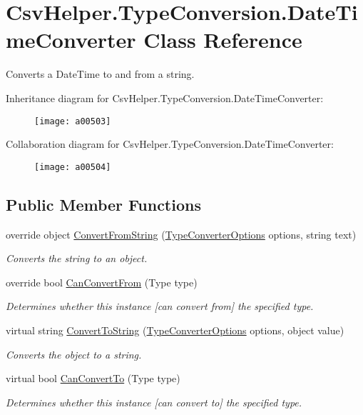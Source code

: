 \hypertarget{a00074}{\section{Csv\-Helper.\-Type\-Conversion.\-Date\-Time\-Converter Class Reference}
\label{a00074}
}


Converts a Date\-Time to and from a string.  




Inheritance diagram for Csv\-Helper.\-Type\-Conversion.\-Date\-Time\-Converter\-:
\nopagebreak
\begin{figure}[H]
\begin{center}
\leavevmode
\texttt{[image: a00503]}
\end{center}
\end{figure}


Collaboration diagram for Csv\-Helper.\-Type\-Conversion.\-Date\-Time\-Converter\-:
\nopagebreak
\begin{figure}[H]
\begin{center}
\leavevmode
\texttt{[image: a00504]}
\end{center}
\end{figure}
\subsection*{Public Member Functions}
\begin{DoxyCompactItemize}
\item 
override object \hyperlink{a00074_a6b1b54cb2d1b200beb8fa3c63e4c064a}{Convert\-From\-String} (\hyperlink{a00168}{Type\-Converter\-Options} options, string text)
\begin{DoxyCompactList}\small\item\em Converts the string to an object. \end{DoxyCompactList}\item 
override bool \hyperlink{a00074_af44239d3bd014b1423fa80f7440bbd25}{Can\-Convert\-From} (Type type)
\begin{DoxyCompactList}\small\item\em Determines whether this instance \mbox{[}can convert from\mbox{]} the specified type. \end{DoxyCompactList}\item 
virtual string \hyperlink{a00078_a36cb2f9b24f15a671293f3a722324c27}{Convert\-To\-String} (\hyperlink{a00168}{Type\-Converter\-Options} options, object value)
\begin{DoxyCompactList}\small\item\em Converts the object to a string. \end{DoxyCompactList}\item 
virtual bool \hyperlink{a00078_acb65bd8c8199d88d5b1629ae35d18514}{Can\-Convert\-To} (Type type)
\begin{DoxyCompactList}\small\item\em Determines whether this instance \mbox{[}can convert to\mbox{]} the specified type. \end{DoxyCompactList}\end{DoxyCompactItemize}



